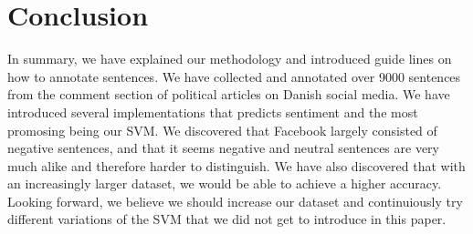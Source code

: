 \section{Conclusion}
In summary, we have explained our methodology and introduced guide lines on how to annotate sentences. We have collected and annotated over 9000 sentences from the comment section of political articles on Danish social media. We have introduced several implementations that predicts sentiment and the most promosing being our SVM. We discovered that Facebook largely consisted of negative sentences, and that it seems negative and neutral sentences are very much alike and therefore harder to distinguish. We have also discovered that with an increasingly larger dataset, we would be able to achieve a higher accuracy. Looking forward, we believe we should increase our dataset and continuiously try different variations of the SVM that we did not get to introduce in this paper.
